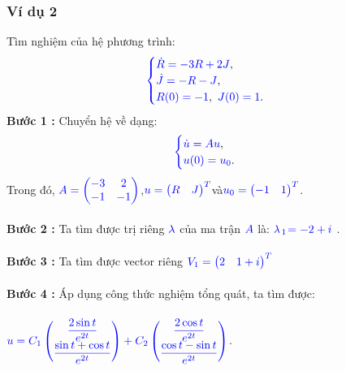 \documentclass[a4paper]{article}
\begin{document}
\subsubsection{Ví dụ 2}
Tìm nghiệm của hệ phương trình:
\begin{align}
	    \textcolor{blue}{
	    \begin{cases}
            \dot R = -3R + 2J \textcolor{black}{,}\\
            \dot J = -R - J \textcolor{black}{,}\\
            R(0) = -1\textcolor{black}{,} \enskip J(0) = 1 \textcolor{black}{.}
        \end{cases}
        }
        \notag
	\end{align}
{\bfseries Bước 1 :} Chuyển hệ về dạng:
\begin{align}
	    \textcolor{blue}{
	    \begin{cases}
            \dot u = Au \textcolor{black}{,}\\
            u(0) = u\sb{0}\textcolor{black}{.}
        \end{cases}
        }
       \notag
	\end{align}
Trong đó,  $\textcolor{blue}{A = \begin{pmatrix} -3 & 2\\ -1 & -1 \end{pmatrix}}$,\enskip $\textcolor{blue}{u = \begin{pmatrix} R & J \end{pmatrix}\sp{T}}$\enskip và\enskip $\textcolor{blue}{u\sb{0} = \begin{pmatrix} -1& 1 \end{pmatrix}\sp{T}}$.\\\\
{\bfseries Bước 2 :} Ta tìm được trị riêng $\textcolor{blue}{\lambda}$ của ma trận $\textcolor{blue}{A}$ là: $\textcolor{blue}{\lambda}$$\textcolor{blue}{\sb{1}}$$\textcolor{blue}{=-2+i}$ .\\\\
{\bfseries Bước 3 :} Ta tìm được vector riêng \enskip $\textcolor{blue}{V\sb{1} = \begin{pmatrix} 2 & 1+i \end{pmatrix}\sp{T}}$\enskip\\\\
{\bfseries Bước 4 :} Áp dụng công thức nghiệm tổng quát, ta tìm được:\\\\
$\textcolor{blue}{u = C\sb{1} \begin{pmatrix} \dfrac{2\sin{t}}{e^{2t}} \\  \dfrac{\sin{t}+\cos{t}}{e^{2t}}  \end{pmatrix} + C\sb{2} \begin{pmatrix} \dfrac{2\cos{t}}{e^{2t}}  \\ \dfrac{\cos{t}-\sin{t}}{e^{2t}}  \end{pmatrix}}$.\\\\
\end{document}
